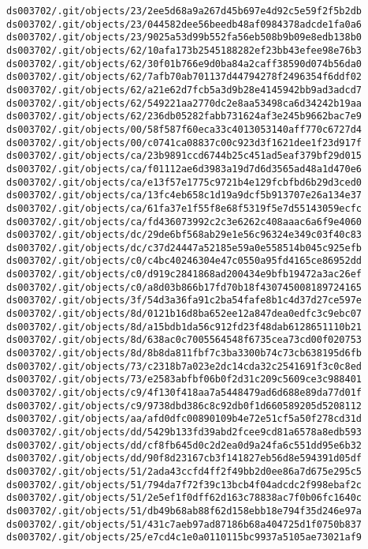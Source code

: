 \documentclass[11pt]{article}
\begin{document}
\begin{Verbatim}[commandchars=\\\{\}]
ds003702/.git/objects/23/2ee5d68a9a267d45b697e4d92c5e59f2f5b2db
ds003702/.git/objects/23/044582dee56beedb48af0984378adcde1fa0a6
ds003702/.git/objects/23/9025a53d99b552fa56eb508b9b09e8edb138b0
ds003702/.git/objects/62/10afa173b2545188282ef23bb43efee98e76b3
ds003702/.git/objects/62/30f01b766e9d0ba84a2caff38590d074b56da0
ds003702/.git/objects/62/7afb70ab701137d44794278f2496354f6ddf02
ds003702/.git/objects/62/a21e62d7fcb5a3d9b28e4145942bb9ad3adcd7
ds003702/.git/objects/62/549221aa2770dc2e8aa53498ca6d34242b19aa
ds003702/.git/objects/62/236db05282fabb731624af3e245b9662bac7e9
ds003702/.git/objects/00/58f587f60eca33c4013053140aff770c6727d4
ds003702/.git/objects/00/c0741ca08837c00c923d3f1621dee1f23d917f
ds003702/.git/objects/ca/23b9891ccd6744b25c451ad5eaf379bf29d015
ds003702/.git/objects/ca/f01112ae6d3983a19d7d6d3565ad48a1d470e6
ds003702/.git/objects/ca/e13f57e1775c9721b4e129fcbfbd6b29d3ced0
ds003702/.git/objects/ca/13fc4eb658c1d19a9dcf5b913707e26a134e37
ds003702/.git/objects/ca/61fa37e1f55f8e68f5319f5e7d55143059ecfc
ds003702/.git/objects/ca/fd436073992c2c3e6262c408aaac6a6f9e4060
ds003702/.git/objects/dc/29de6bf568ab29e1e56c96324e349c03f40c83
ds003702/.git/objects/dc/c37d24447a52185e59a0e558514b045c925efb
ds003702/.git/objects/c0/c4bc40246304e47c0550a95fd4165ce86952dd
ds003702/.git/objects/c0/d919c2841868ad200434e9bfb19472a3ac26ef
ds003702/.git/objects/c0/a8d03b866b17fd70b18f430745008189724165
ds003702/.git/objects/3f/54d3a36fa91c2ba54fafe8b1c4d37d27ce597e
ds003702/.git/objects/8d/0121b16d8ba652ee12a847dea0edfc3c9ebc07
ds003702/.git/objects/8d/a15bdb1da56c912fd23f48dab6128651110b21
ds003702/.git/objects/8d/638ac0c7005564548f6735cea73cd00f020753
ds003702/.git/objects/8d/8b8da811fbf7c3ba3300b74c73cb638195d6fb
ds003702/.git/objects/73/c2318b7a023e2dc14cda32c2541691f3c0c8ed
ds003702/.git/objects/73/e2583abfbf06b0f2d31c209c5609ce3c988401
ds003702/.git/objects/c9/4f130f418aa7a5448479ad6d688e89da77d01f
ds003702/.git/objects/c9/9738dbd386c8c92db0f1d660589205d5208112
ds003702/.git/objects/aa/afd0dfc00890109b4e72e51cf5a50f278cd31d
ds003702/.git/objects/dd/5429b133fd39abd2fcee9cd81a6578a8edb593
ds003702/.git/objects/dd/cf8fb645d0c2d2ea0d9a24fa6c551dd95e6b32
ds003702/.git/objects/dd/90f8d23167cb3f141827eb56d8e594391d05df
ds003702/.git/objects/51/2ada43ccfd4ff2f49bb2d0ee86a7d675e295c5
ds003702/.git/objects/51/794da7f72f39c13bcb4f04adcdc2f998ebaf2c
ds003702/.git/objects/51/2e5ef1f0dff62d163c78838ac7f0b06fc1640c
ds003702/.git/objects/51/db49b68ab88f62d158ebb18e794f35d246e97a
ds003702/.git/objects/51/431c7aeb97ad87186b68a404725d1f0750b837
ds003702/.git/objects/25/e7cd4c1e0a0110115bc9937a5105ae73021af9

\end{Verbatim}
\end{document}
